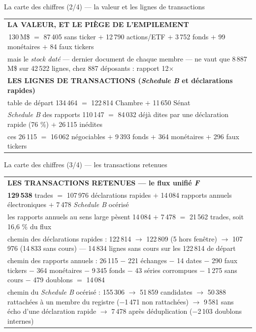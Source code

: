 \documentclass[11pt,aspectratio=169]{beamer}
\newcommand{\defl}[1]{{\scriptsize\color{black!55}#1}}
\begin{document}
\begin{frame}{La carte des chiffres (2/4) --- la valeur et les lignes de transactions}
  \centering
  {\footnotesize
  \begin{tabular}{@{}p{}@{}}
  \toprule
  \textbf{LA VALEUR, ET LE PIÈGE DE L'EMPILEMENT}\\
  \quad 104\,130\,M\$ $=$ 87\,405 sans ticker $+$ 12\,790 actions/ETF $+$ 3\,752 fonds
        $+$ 99 monétaires $+$ 84 faux tickers\\
  \quad mais le \emph{stock daté} --- dernier document de chaque membre --- ne vaut que
        8\,887\,M\$ sur 42\,522 lignes, chez 887 déposants : rapport 12$\times$\\
  \midrule
  \textbf{LES LIGNES DE TRANSACTIONS (\emph{Schedule B} et déclarations rapides)}\\
  \quad table de départ 134\,464 $=$ 122\,814 Chambre $+$ 11\,650 Sénat\\
  \quad \emph{Schedule B} des rapports 110\,147 $=$ 84\,032 déjà dites par une déclaration rapide (76 \%) $+$ 26\,115 inédites\\
  \quad ces 26\,115 $=$ 16\,062 négociables $+$ 9\,393 fonds $+$ 364 monétaires $+$ 296 faux tickers\\
  \bottomrule
  \end{tabular}}
\end{frame}

\begin{frame}{La carte des chiffres (3/4) --- les transactions retenues}
  \centering
  {\footnotesize
  \begin{tabular}{@{}p{}@{}}
  \toprule
  \textbf{LES TRANSACTIONS RETENUES --- le flux unifié \emph{F}}\\
  \quad \textbf{129\,538} trades $=$ 107\,976 déclarations rapides $+$ 14\,084 rapports annuels
        électroniques $+$ 7\,478 \emph{Schedule B} océrisé\\
  \quad les rapports annuels au sens large pèsent 14\,084 $+$ 7\,478 $=$ 21\,562 trades, soit 16,6 \% du flux\\
  \quad chemin des déclarations rapides : 122\,814 $\rightarrow$ 122\,809 (5 hors fenêtre)
        $\rightarrow$ 107\,976 (14\,833 sans cours) \defl{--- 14\,834 lignes sans cours sur les 122\,814 de départ}\\
  \quad chemin des rapports annuels : 26\,115 $-$ 221 échanges $-$ 14 dates $-$ 290 faux tickers
        $-$ 364 monétaires $-$ 9\,345 fonds $-$ 43 séries corrompues $-$ 1\,275 sans cours
        $-$ 479 doublons $=$ 14\,084\\
  \quad chemin du \emph{Schedule B} océrisé : 155\,306 $\rightarrow$ 51\,859 candidates
        $\rightarrow$ 50\,388 rattachées à un membre du registre \defl{($-$1\,471 non rattachées)}
        $\rightarrow$ 9\,581 sans écho d'une déclaration rapide
        $\rightarrow$ 7\,478 après déduplication \defl{($-$2\,103 doublons internes)}\\
  \bottomrule
  \end{tabular}}
\end{frame}
\end{document}
